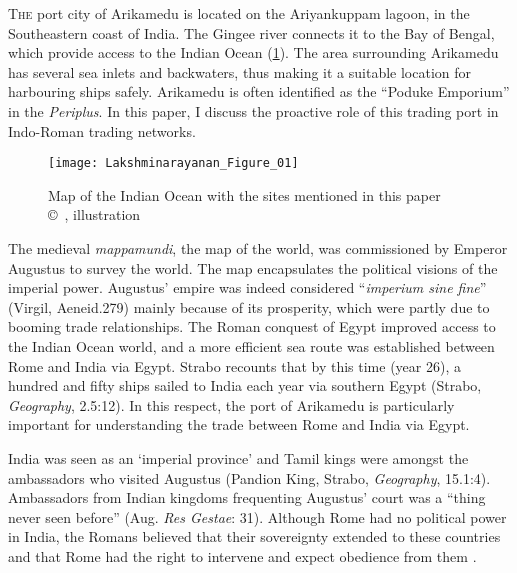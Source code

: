 \lettrine{T}{he} port city of Arikamedu is located on the Ariyankuppam lagoon, in the Southeastern coast of India. The Gingee river connects it to the Bay of Bengal, which provide access to the Indian Ocean (\cref{fig:Lakshminarayanan_Figure_01}). The area surrounding Arikamedu has several sea inlets and backwaters, thus making it a suitable location for harbouring ships safely. Arikamedu is often identified as the “Poduke Emporium” in the \emph{Periplus}. In this paper, I discuss the proactive role of this trading port in Indo-Roman trading networks.

\begin{figure}[!tb]
	\texttt{[image: Lakshminarayanan\_Figure\_01]}
	\caption{Map of the Indian Ocean with the sites mentioned in this paper\\
		{\normalfont\scriptsize\copyright\
			\shortauthor, illustration
	}}
	\label{fig:Lakshminarayanan_Figure_01}
\end{figure}

The medieval \emph{mappamundi}, the map of the world, was commissioned by Emperor Augustus to survey the world. The map encapsulates the political visions of the imperial power. Augustus’ empire was indeed considered “\emph{imperium sine fine}” (Virgil, Aeneid.279) mainly because of its prosperity, which were partly due to booming trade relationships. The Roman conquest of Egypt improved access to the Indian Ocean world, and a more efficient sea route was established between Rome and India via Egypt. Strabo recounts that by this time (year 26), a hundred and fifty ships sailed to India each year via southern Egypt (Strabo, \emph{Geography}, 2.5:12). In this respect, the port of Arikamedu is particularly important for understanding the trade between Rome and India via Egypt.

India was seen as an ‘imperial province’ and Tamil kings were amongst the ambassadors who visited Augustus (Pandion King, Strabo, \emph{Geography}, 15.1:4). Ambassadors from Indian kingdoms frequenting Augustus’ court was a “thing never seen before” (Aug. \emph{Res Gestae}: 31). Although Rome had no political power in India, the Romans believed that their sovereignty extended to these countries and that Rome had the right to intervene and expect obedience from them \parencite[][34-37]{whittaker1994}.

